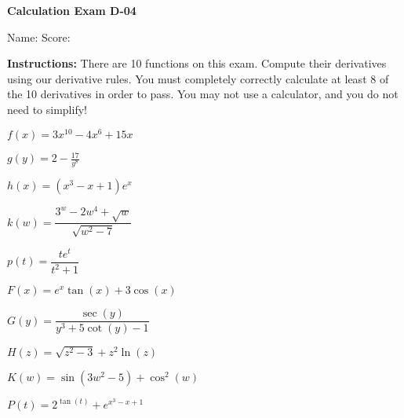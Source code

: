 \documentclass[10pt,answers,addpoints]{exam}
\begin{document}



{\bfseries\large Calculation Exam D-04}
{}%

Name: \makebox[4.18in]{\hrulefill} \quad Score: \makebox[0.75in]{\hrulefill} %


\vspace{0.2in}

\textbf{Instructions: } There are 10 functions on this exam. Compute their derivatives using our derivative rules. You must completely correctly calculate at least 8 of the 10 derivatives in order to pass. You may not use a calculator, and you do not need to simplify! 




\begin{questions}

\question $f(x)=3x^{10}-4x^6+15x$

\vfill

\question $g(y) = 2-\frac{17}{y^8}$

\vfill

\question $h(x) = (x^3-x+1)e^x$

\vfill


\question $k(w) = \dfrac{3^w-2w^4+\sqrt{w}}{\sqrt{w^2-7}}$

\vfill

\question $p(t) = \dfrac{te^t}{t^2+1}$

\vfill

\newpage


\question $F(x) = e^x\tan(x)+3\cos(x)$

\vfill


\question $G(y) = \dfrac{\sec(y)}{y^3+5\cot(y)-1}$

\vfill

\question $H(z) = \sqrt{z^2-3}+z^2\ln(z)$

\vfill

\question $K(w) = \sin(3w^2-5)+\cos^2(w)$

\vfill

\question $P(t) = 2^{\tan(t)}+e^{x^3-x+1}$

\vfill

\thispagestyle{empty}

\end{questions}
\end{document}
